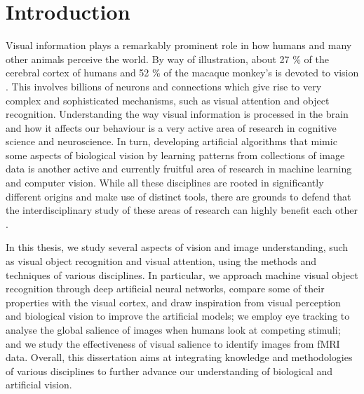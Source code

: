 {
\chapter{Introduction}
\label{ch:intro}
\renewcommand{\chapterpath}{includes/intro}
Visual information plays a remarkably prominent role in how humans and many other animals perceive the world. By way of illustration, about 27 \% of the cerebral cortex of humans and 52 \% of the macaque monkey's is devoted to vision \citep{vanessen2003visualcortex}. This involves billions of neurons and connections which give rise to very complex and sophisticated mechanisms, such as visual attention and object recognition. Understanding the way visual information is processed in the brain and how it affects our behaviour is a very active area of research in cognitive science and neuroscience. In turn, developing artificial algorithms that mimic some aspects of biological vision by learning patterns from collections of image data is another active and currently fruitful area of research in machine learning and computer vision. While all these disciplines are rooted in significantly different origins and make use of distinct tools, there are grounds to defend that the interdisciplinary study of these areas of research can highly benefit each other \citep{bengio2015dlandneuroscience, marblestone2016dlandneuroscience, hassabis2017aiandneuroscience, bowers2017pdp, richards2019dlandneuroscience, kietzmann2019dnncompneuro, lindsay2020dlandneuroscience, saxe2020dlandneuroscience}.

In this thesis, we study several aspects of vision and image understanding, such as visual object recognition and visual attention, using the methods and techniques of various disciplines. In particular, we approach machine visual object recognition through deep artificial neural networks, compare some of their properties with the visual cortex, and draw inspiration from visual perception and biological vision to improve the artificial models; we employ eye tracking to analyse the global salience of images when humans look at competing stimuli; and we study the effectiveness of visual salience to identify images from fMRI data. Overall, this dissertation aims at integrating knowledge and methodologies of various disciplines to further advance our understanding of biological and artificial vision.

}
